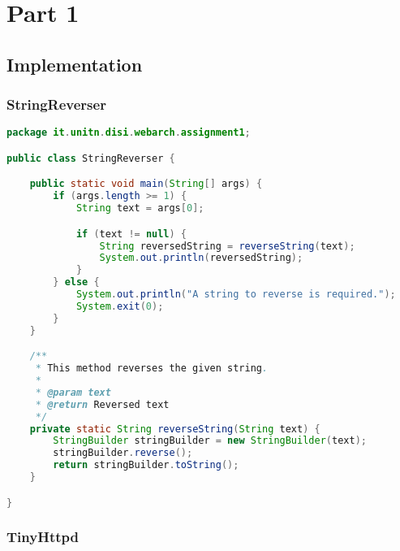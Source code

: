 \section{Part 1}

\subsection{Implementation}

\subsubsection{StringReverser}

\begin{lstlisting}[label=lst:01_part1_impl_stringreverser_code, caption=\texttt{StringReverser} class implementation, language=java]
package it.unitn.disi.webarch.assignment1;

public class StringReverser {

    public static void main(String[] args) {
        if (args.length >= 1) {
            String text = args[0];

            if (text != null) {
                String reversedString = reverseString(text);
                System.out.println(reversedString);
            }
        } else {
            System.out.println("A string to reverse is required.");
            System.exit(0);
        }
    }

    /**
     * This method reverses the given string.
     *
     * @param text
     * @return Reversed text
     */
    private static String reverseString(String text) {
        StringBuilder stringBuilder = new StringBuilder(text);
        stringBuilder.reverse();
        return stringBuilder.toString();
    }

}
\end{lstlisting}

\newpage
\subsubsection{TinyHttpd}

